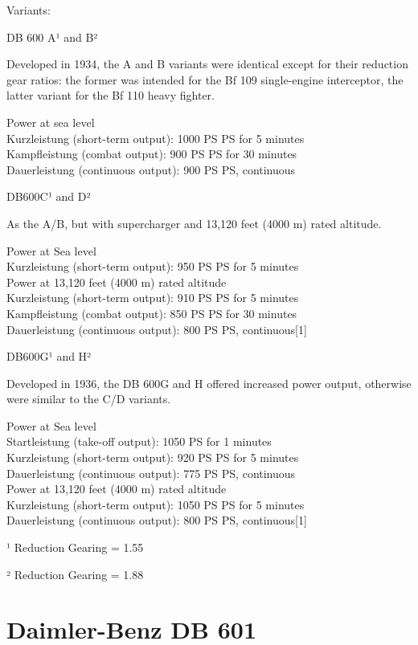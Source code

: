 Variants:

DB 600 A¹ and B²

Developed in 1934, the A and B variants were identical except for their
reduction gear ratios: the former was intended for the Bf 109
single-engine interceptor, the latter variant for the Bf 110 heavy
fighter.

Power at sea level\\
Kurzleistung (short-term output): 1000 PS PS for 5 minutes\\
Kampfleistung (combat output): 900 PS PS for 30 minutes\\
Dauerleistung (continuous output): 900 PS PS, continuous

DB600C¹ and D²

As the A/B, but with supercharger and 13,120 feet (4000 m) rated
altitude.

Power at Sea level\\
Kurzleistung (short-term output): 950 PS PS for 5 minutes\\
Power at 13,120 feet (4000 m) rated altitude\\
Kurzleistung (short-term output): 910 PS PS for 5 minutes\\
Kampfleistung (combat output): 850 PS PS for 30 minutes\\
Dauerleistung (continuous output): 800 PS PS, continuous{[}1{]}

DB600G¹ and H²

Developed in 1936, the DB 600G and H offered increased power output,
otherwise were similar to the C/D variants.

Power at Sea level\\
Startleistung (take-off output): 1050 PS for 1 minutes\\
Kurzleistung (short-term output): 920 PS PS for 5 minutes\\
Dauerleistung (continuous output): 775 PS PS, continuous\\
Power at 13,120 feet (4000 m) rated altitude\\
Kurzleistung (short-term output): 1050 PS PS for 5 minutes\\
Dauerleistung (continuous output): 800 PS PS, continuous{[}1{]}

¹ Reduction Gearing = 1.55

² Reduction Gearing = 1.88

\section{Daimler-Benz DB 601}\label{daimler-benz-db-601}

